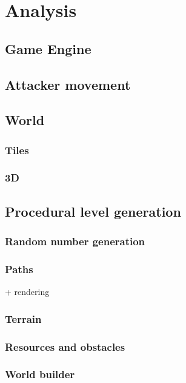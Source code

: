 \chapter{Analysis}

\section{Game Engine}

\section{Attacker movement}

\section{World}

\subsection{Tiles}

\subsection{3D}

\section{Procedural level generation}

\subsection{Random number generation}

\subsection{Paths}
+ rendering
\subsection{Terrain}

\subsection{Resources and obstacles}

\subsection{World builder}

